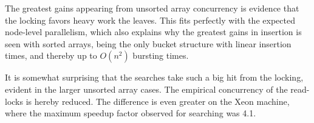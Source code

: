 The greatest gains appearing from unsorted array concurrency is evidence that
the locking favors heavy work the leaves. This fits perfectly with the expected
node-level parallelism, which also explains why the greatest gains in insertion
is seen with sorted arrays, being the only bucket structure with linear insertion
times, and thereby up to $O(n^2)$ bursting times.

It is somewhat surprising that the searches take such a big hit from the locking,
evident in the larger unsorted array cases. The empirical concurrency of the
read-locks is hereby reduced. The difference is even greater on the Xeon machine,
where the maximum speedup factor observed for searching was 4.1.
